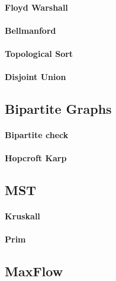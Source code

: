\documentclass[a4paper]{article}
\begin{document}
\newpage
\paragraph{Floyd Warshall} \hfill


\newpage
\paragraph{Bellmanford} \hfill

\paragraph{Topological Sort} \hfill


\newpage
\paragraph{Disjoint Union} \hfill



\newpage
\subsection{Bipartite Graphs}
\paragraph{Bipartite check} \hfill


\newpage
\paragraph{Hopcroft Karp} \hfill

\subsection{MST}
\paragraph{Kruskall} \hfill

\paragraph{Prim} \hfill

\subsection{MaxFlow}
%
\end{document}
